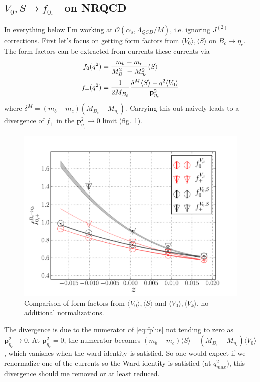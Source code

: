 \subsection{$V_0,S\to f_{0,+}$ on NRQCD}
\label{sec:V0Sf0p}

In everything below I'm working at $\mathcal{O}(\alpha_s,\Lambda_{QCD}/M)$, i.e. ignoring $J^{(2)}$ corrections. First let's focus on getting form factors from $\langle V_0 \rangle, \langle S \rangle$ on $B_c\to\eta_c$. The form factors can be extracted from currents these currents via
\begin{align}
	f_0(q^2) &= { m_b - m_c \over M_{B_c}^2-M_{\eta_c}^2 } \langle S \rangle \\
	f_+(q^2) &= {1\over 2M_{B_c}} { \delta^M  \langle S \rangle - q^2 \langle V_0 \rangle 
		\over {\textbf{p}}^2_{\eta_c} }
		\label{eq:fplus}
\end{align}
where $\delta^M = (m_b-m_c)(M_{B_c}-M_{\eta_c})$. Carrying this out naively leads to a divergence of $f_+$ in the ${\textbf{p}}_{\eta_c}^2\to 0$ limit (fig. \ref{fig:naive}).
\begin{figure}[htb!]
\centering
\includegraphics[scale=0.65]{images/NRQCD/Bcetac_bothways_noV0norm.pdf}
\caption{Comparison of form factors from $\langle V_0 \rangle, \langle S \rangle$ and $\langle V_0 \rangle,\langle V_k \rangle$, no additional normalizations.}
\label{fig:naive}
\end{figure}
The divergence is due to the numerator of \eqref{eq:fplus} not tending to zero as ${\textbf{p}}_{\eta_c}^2\to 0$. At ${\textbf{p}}_{\eta_c}^2 = 0$, the numerator becomes $(m_b-m_c) \langle S \rangle - (M_{B_c}-M_{\eta_c}) \langle V_0 \rangle$, which vanishes when the ward identity is satisfied. So one would expect if we renormalize one of the currents so the Ward identity is satisfied (at $q^2_{max}$), this divergence should me removed or at least reduced.
